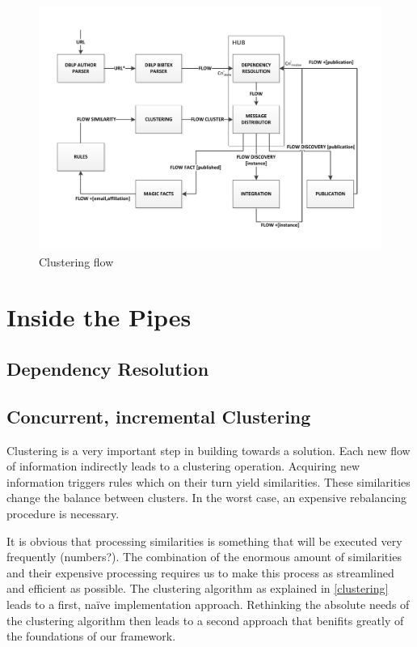 \begin{figure}[htb]
	\centering
		\includegraphics[width=1\textwidth]{fig/completepipesmall}
	\caption{Clustering flow}
	\label{fig:completepipesmall}
\end{figure}

\section{Inside the Pipes}

\subsection{Dependency Resolution}

\subsection{Concurrent, incremental Clustering}

Clustering is a very important step in building towards a solution. Each new flow of information indirectly leads to a clustering operation. Acquiring new information triggers rules which on their turn yield similarities. These similarities change the balance between clusters. In the worst case, an expensive rebalancing procedure is necessary.

It is obvious that processing similarities is something that will be executed very frequently (numbers?). The combination of the enormous amount of similarities and their expensive processing requires us to make this process as streamlined and efficient as possible. The clustering algorithm as explained in \autoref{clustering} leads to a first, na\"ive implementation approach. Rethinking the absolute needs of the clustering algorithm then leads to a second approach that benifits greatly of the foundations of our framework.

